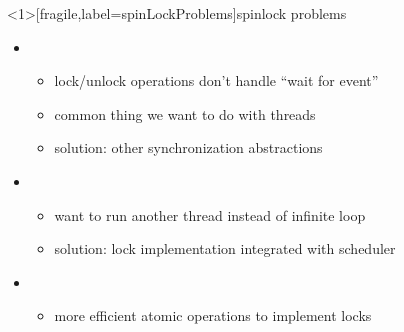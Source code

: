 \begin{frame}<1>[fragile,label=spinLockProblems]{spinlock problems}
    \begin{itemize}
    \item {}
        \begin{itemize}
        \item lock/unlock operations don't handle ``wait for event''
        \item common thing we want to do with threads
        \item solution: other synchronization abstractions
        \end{itemize}
    \item {}
        \begin{itemize}
        \item want to run another thread instead of infinite loop
        \item solution: lock implementation integrated with scheduler
        \end{itemize}
    \item {}
        \begin{itemize}
        \item more efficient atomic operations to implement locks
        \end{itemize}
    \end{itemize}
\end{frame}
